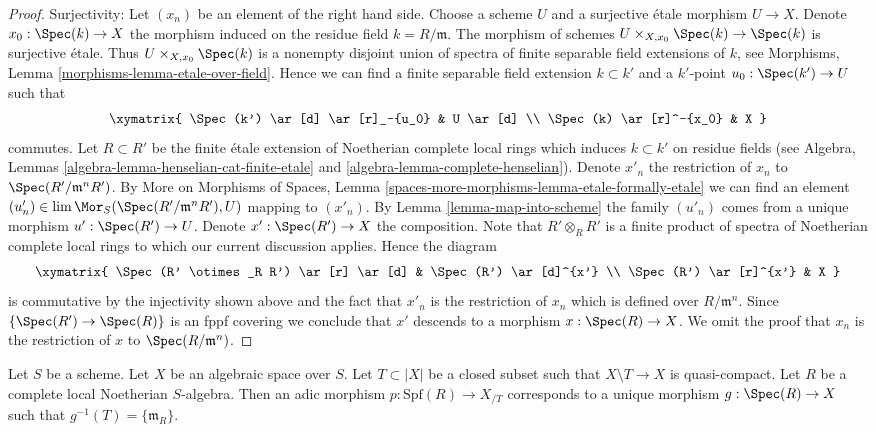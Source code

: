 \begin{proof}
\medskip\noindent
Surjectivity: Let $(x_n)$ be an element of the right hand side.
Choose a scheme $U$ and a surjective \'etale morphism $U \to X$. 
Denote $x_0 : \Spec(k) \to X$ the morphism induced on the residue field
$k = R/\mathfrak m$. The morphism of schemes
$U \times_{X, x_0} \Spec(k) \to \Spec(k)$ is surjective \'etale.
Thus $U \times_{X, x_0} \Spec(k)$ is a nonempty disjoint union of spectra
of finite separable field extensions of $k$, see
Morphisms, Lemma \ref{morphisms-lemma-etale-over-field}.
Hence we can find a finite separable field extension $k \subset k'$
and a $k'$-point $u_0 : \Spec(k') \to U$ such that
$$
\xymatrix{
\Spec(k') \ar[d] \ar[r]_-{u_0} & U \ar[d] \\
\Spec(k) \ar[r]^-{x_0} & X
}
$$
commutes. Let $R \subset R'$ be the finite \'etale extension of Noetherian
complete local rings which induces $k \subset k'$ on residue fields
(see Algebra, Lemmas \ref{algebra-lemma-henselian-cat-finite-etale} and
\ref{algebra-lemma-complete-henselian}). Denote $x'_n$ the restriction
of $x_n$ to $\Spec(R'/\mathfrak m^nR')$. By
More on Morphisms of Spaces, Lemma
\ref{spaces-more-morphisms-lemma-etale-formally-etale}
we can find an element
$(u'_n) \in \lim \Mor_S(\Spec(R'/\mathfrak m^nR'), U)$
mapping to $(x'_n)$. By Lemma \ref{lemma-map-into-scheme}
the family $(u'_n)$ comes from a unique
morphism $u' : \Spec(R') \to U$. Denote $x' : \Spec(R') \to X$ the
composition. Note that $R' \otimes_R R'$ is a finite product of spectra of
Noetherian complete local rings to which our current discussion applies.
Hence the diagram
$$
\xymatrix{
\Spec(R' \otimes_R R') \ar[r] \ar[d] & \Spec(R') \ar[d]^{x'} \\
\Spec(R') \ar[r]^{x'} & X
}
$$
is commutative by the injectivity shown above and the fact that
$x'_n$ is the restriction of $x_n$ which is defined over $R/\mathfrak m^n$.
Since $\{\Spec(R') \to \Spec(R)\}$ is an fppf covering we conclude
that $x'$ descends to a morphism $x : \Spec(R) \to X$.
We omit the proof that $x_n$ is the restriction of $x$ to
$\Spec(R/\mathfrak m^n)$.
\end{proof}

\begin{lemma}
\label{lemma-adic-into-completion}
Let $S$ be a scheme. Let $X$ be an algebraic space over $S$.
Let $T \subset |X|$ be a closed subset such that
$X \setminus T \to X$ is quasi-compact. Let $R$ be a complete local
Noetherian $S$-algebra. Then an adic morphism $p : \text{Spf}(R) \to X_{/T}$
corresponds to a unique morphism $g : \Spec(R) \to X$ such
that $g^{-1}(T) = \{\mathfrak m_R\}$. 
\end{lemma}

